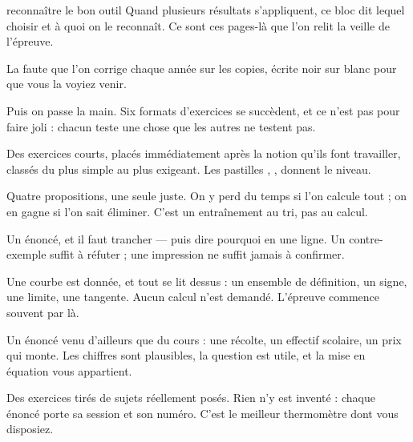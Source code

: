 \begin{methode}{reconnaître le bon outil}
Quand plusieurs résultats s'appliquent, ce bloc dit lequel choisir et à quoi
on le reconnaît. Ce sont ces pages-là que l'on relit la veille de l'épreuve.
\end{methode}

\begin{erreurclassique}
La faute que l'on corrige chaque année sur les copies, écrite noir sur blanc
pour que vous la voyiez venir.
\end{erreurclassique}

\noindent Puis on passe la main. Six formats d'exercices se succèdent, et ce
n'est pas pour faire joli : chacun teste une chose que les autres ne testent
pas.

\begin{entrainement}
Des exercices courts, placés immédiatement après la notion qu'ils font
travailler, classés du plus simple au plus exigeant. Les pastilles
, ,  donnent le niveau.
\end{entrainement}

\begin{qcm}
Quatre propositions, une seule juste. On y perd du temps si l'on calcule
tout ; on en gagne si l'on sait éliminer. C'est un entraînement au tri, pas
au calcul.
\end{qcm}

\begin{vraifaux}
Un énoncé, et il faut trancher — puis dire pourquoi en une ligne. Un contre-%
exemple suffit à réfuter ; une impression ne suffit jamais à confirmer.
\end{vraifaux}

\begin{lecturegraphique}
Une courbe est donnée, et tout se lit dessus : un ensemble de définition, un
signe, une limite, une tangente. Aucun calcul n'est demandé. L'épreuve
commence souvent par là.
\end{lecturegraphique}

\begin{situation}
Un énoncé venu d'ailleurs que du cours : une récolte, un effectif scolaire,
un prix qui monte. Les chiffres sont plausibles, la question est utile, et la
mise en équation vous appartient.
\end{situation}

\begin{annales}
Des exercices tirés de sujets réellement posés. Rien n'y est inventé : chaque
énoncé porte sa session et son numéro. C'est le meilleur thermomètre dont
vous disposiez.
\end{annales}

